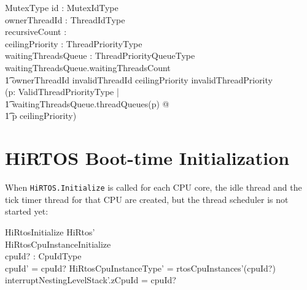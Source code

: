 \documentclass[11pt,letterpaper,twoside,openany]{book}
\begin{document}
\begin{schema}{MutexType}
   id : MutexIdType \\
   ownerThreadId : ThreadIdType \\
   recursiveCount : \nat \\
   ceilingPriority : ThreadPriorityType \\
   waitingThreadsQueue : ThreadPriorityQueueType
\where
   waitingThreadsQueue.waitingThreadsCount  \implies \\
   \t1 ownerThreadId \neq invalidThreadId
\also
   ceilingPriority \neq invalidThreadPriority \implies \\
   (\forall p: ValidThreadPriorityType | \\
   \t1     waitingThreadsQueue.threadQueues(p) \neq \emptyset @ \\
   \t1     p \leq ceilingPriority)
\end{schema}

\section{HiRTOS Boot-time Initialization}

When \verb`HiRTOS.Initialize` is called for each CPU core, the idle thread
and the tick timer thread for that CPU are created, but the thread
scheduler is not started yet:

\begin{schema}{HiRtosInitialize}
   HiRtos' \\
   HiRtosCpuInstanceInitialize \\
   cpuId? : CpuIdType \\
\where
   cpuId' = cpuId?
\also
   \theta HiRtosCpuInstanceType' = rtosCpuInstances'(cpuId?)
\also
   interruptNestingLevelStack'.zCpuId = cpuId?
\end{schema}
\end{document}
